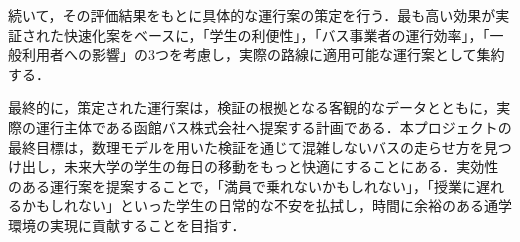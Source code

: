 続いて，その評価結果をもとに具体的な運行案の策定を行う．最も高い効果が実証された快速化案をベースに，「学生の利便性」，「バス事業者の運行効率」，「一般利用者への影響」の3つを考慮し，実際の路線に適用可能な運行案として集約する．

最終的に，策定された運行案は，検証の根拠となる客観的なデータとともに，実際の運行主体である函館バス株式会社へ提案する計画である．本プロジェクトの最終目標は，数理モデルを用いた検証を通じて混雑しないバスの走らせ方を見つけ出し，未来大学の学生の毎日の移動をもっと快適にすることにある．実効性のある運行案を提案することで，「満員で乗れないかもしれない」，「授業に遅れるかもしれない」といった学生の日常的な不安を払拭し，時間に余裕のある通学環境の実現に貢献することを目指す．

